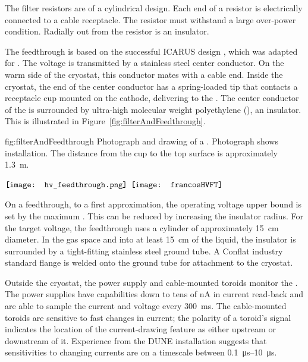 The %
filter resistors are of a cylindrical design. 
Each end of a  resistor is electrically connected to a cable receptacle. 
The resistor %
must withstand a large over-power condition.  Radially out from the resistor is an insulator. 

The  feedthrough %
is based on the successful ICARUS design \cite{Icarus-T600}, 
which was adapted for .  The voltage is transmitted by a stainless steel center conductor.  On the warm side of the cryostat, this conductor mates with a cable end.  Inside the cryostat, the end of the center conductor has a spring-loaded tip that %
contacts a receptacle cup mounted on the cathode, delivering  to the .  The center conductor of the \fdth is surrounded by ultra-high molecular weight polyethylene (), an insulator. This is illustrated in Figure~\ref{fig:filterAndFeedthrough}.

\begin{dunefigure}{fig:filterAndFeedthrough}
{Photograph and drawing of a  \fdth{}. Photograph shows  installation. The distance from the cup to the top surface is approximately \SI{1.3}{\meter}. } 
\begin{minipage}{\textwidth}%
  \centering
 $\vcenter{\hbox{\texttt{[image: hv\_feedthrough.png]}}}$
 \hspace*{0.001\textwidth}  $\vcenter{\hbox{\texttt{[image: francosHVFT]}}}$
\end{minipage}
\end{dunefigure}

On a feedthrough, to a first approximation, the operating voltage upper bound is set by the maximum \efield{}. This \efield{} can be reduced by increasing the insulator radius.  For the target voltage, the feedthrough uses a  cylinder of approximately \SI{15}{cm} diameter.  In the gas space and into at least \SI{15}{\centi\meter} of the liquid, the insulator is surrounded by a tight-fitting stainless steel ground tube.  A %
Conflat industry standard flange is welded onto the ground tube for attachment to the cryostat.

Outside the cryostat, the  power supply and cable-mounted toroids monitor the .    The power supplies 
have capabilities down to tens of \si{\nano\ampere} in current read-back 
and are able to sample the current and voltage every \SI{300}{\ms}.  The cable-mounted toroids are sensitive to fast changes in current;  
the polarity of a toroid's signal  
indicates the location of the current-drawing feature as either upstream or downstream of it.  Experience from the DUNE  installation suggests that sensitivities to changing currents %
are on a timescale between \SIrange{0.1}{10}{\micro\s}.

